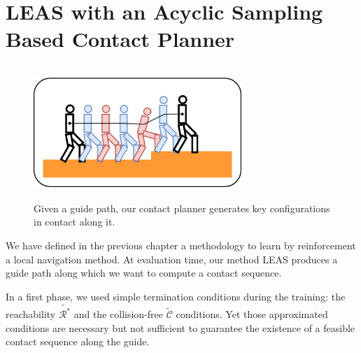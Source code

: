 


\chapter{LEAS with an Acyclic Sampling Based Contact Planner}
\label{sec:CP-SB}
\minitoc
\bigskip

\begin{figure}[h]
    \centering
    \includegraphics[width=0.7\textwidth, height=5cm]{Figures/Chapter_CPSB/strategies_cp_guide_A.png}
    \caption{Given a guide path, our contact planner generates key configurations in contact along it.}
    \label{fig:cp-sb:strategy_cp-sb}
\end{figure}


We have defined in the previous chapter a methodology to learn by reinforcement a local navigation method.
At evaluation time, our method LEAS produces a guide path along which we want to compute a contact sequence.

In a first phase, we used simple termination conditions during the training: the reachability $\tilde{\mathcal{R}^*}$ and the collision-free $\tilde{\mathcal{C}}$ conditions.
Yet those approximated conditions are necessary but not sufficient to guarantee the existence of a feasible contact sequence along the guide.

